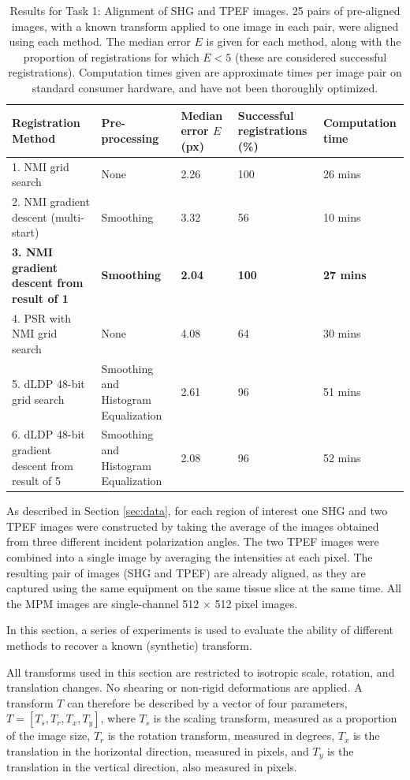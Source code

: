 \documentclass{report}
\begin{document}
\begin{table}
\centering
\begin{tabular}{|p{1.2in}|p{1.05in}|p{0.6in}|p{0.9in}|p{0.9in}|}
\hline
\textbf{Registration Method} & \textbf{Pre-processing} & \textbf{Median error $E$ (px)} & \textbf{Successful registrations (\%)} & \textbf{Computation time} \\
\hline
\hline
1. NMI grid search & None & 2.26 & 100 & 26 mins \\
\hline
2. NMI gradient descent (multi-start) & Smoothing & 3.32  & 56 & 10 mins \\
\hline
\textbf{3. NMI gradient descent from result of 1} & \textbf{Smoothing} & \textbf{2.04}  & \textbf{100} & \textbf{27 mins} \\ 
\hline
4. PSR with NMI grid search & None & 4.08 & 64 & 30 mins \\
\hline
5. dLDP 48-bit grid search & Smoothing and Histogram Equalization & 2.61 & 96 & 51 mins \\
\hline
6. dLDP 48-bit gradient descent from result of 5 & Smoothing and Histogram Equalization & 2.08  & 96 & 52 mins \\
\hline
\end{tabular}
\caption{Results for Task 1: Alignment of SHG and TPEF images. 25 pairs of pre-aligned images, with a known transform applied to one image in each pair, were aligned using each method. The median error $E$ is given for each method, along with the proportion of registrations for which $E<5$ (these are considered successful registrations). Computation times given are approximate times per image pair on standard consumer hardware, and have not been thoroughly optimized.}
\label{tab:task1results}
\end{table}


As described in Section \ref{sec:data}, for each region of interest one SHG and two TPEF images were constructed by taking the average of the images obtained from three different incident polarization angles. The two TPEF images were combined into a single image by averaging the intensities at each pixel. The resulting pair of images (SHG and TPEF) are already aligned, as they are captured using the same equipment on the same tissue slice at the same time. All the MPM images are single-channel 512 $\times$ 512 pixel images. 

In this section, a series of experiments is used to evaluate the ability of different methods to recover a known (synthetic) transform.

All transforms used in this section are restricted to isotropic scale, rotation, and translation changes. No shearing or non-rigid deformations are applied. A transform $T$ can therefore be described by a vector of four parameters, $T=[T_s, T_r, T_x, T_y]$, where $T_s$ is the scaling transform, measured as a proportion of the image size, $T_r$ is the rotation transform, measured in degrees, $T_x$ is the translation in the horizontal direction, measured in pixels, and $T_y$ is the translation in the vertical direction, also measured in pixels.
\end{document}

